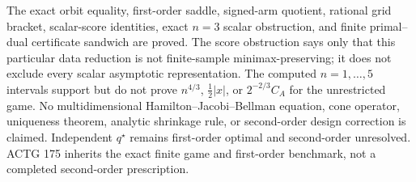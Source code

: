 The exact orbit equality, first-order saddle, signed-arm quotient, rational grid bracket, scalar-score identities, exact \(n=3\) scalar obstruction, and finite primal--dual certificate sandwich are proved.  The score obstruction says only that this particular data reduction is not finite-sample minimax-preserving; it does not exclude every scalar asymptotic representation.  The computed \(n=1,\ldots,5\) intervals support but do not prove \(n^{4/3}\), \(\tfrac12|x|\), or \(2^{-2/3}C_A\) for the unrestricted game.  No multidimensional Hamilton--Jacobi--Bellman equation, cone operator, uniqueness theorem, analytic shrinkage rule, or second-order design correction is claimed.  Independent \(q^\star\) remains first-order optimal and second-order unresolved.  ACTG 175 inherits the exact finite game and first-order benchmark, not a completed second-order prescription.